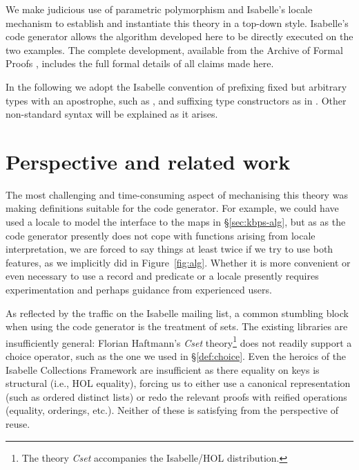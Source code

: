 \documentclass{llncs}
\newcommand{\isafun}[1]{{\sf #1}}
\renewcommand{\isacharprime}{\ensuremath{\mathit{\mskip2mu'\mskip-2mu}}}
\begin{document}
We make judicious use of parametric polymorphism and Isabelle's locale
mechanism \cite{DBLP:conf/mkm/Ballarin06} to establish and instantiate
this theory in a top-down style. Isabelle's code generator
\cite{Haftmann-Nipkow:2010:code} allows the algorithm developed here
to be directly executed on the two examples. The complete development,
available from the Archive of Formal Proofs \cite{Gammie:2011},
includes the full formal details of all claims made here.

In the following we adopt the Isabelle convention of prefixing fixed
but arbitrary types with an apostrophe, such as
\isa{{\isaliteral{27}{\isacharprime}}a}, and suffixing type
constructors as in \isa{{\isaliteral{27}{\isacharprime}}a\
  \isafun{list}}. Other non-standard syntax will be explained as it
arises.



\section{Perspective and related work}
\label{sec:perspective}

The most challenging and time-consuming aspect of mechanising this
theory was making definitions suitable for the code generator. For
example, we could have used a locale to model the interface to the
maps in \S\ref{sec:kbps-alg}, but as as the code generator presently
does not cope with functions arising from locale interpretation, we
are forced to say things at least twice if we try to use both
features, as we implicitly did in Figure~\ref{fig:alg}. Whether it is
more convenient or even necessary to use a record and predicate or a
locale presently requires experimentation and perhaps guidance from
experienced users.

As reflected by the traffic on the Isabelle mailing list, a common
stumbling block when using the code generator is the treatment of
sets. The existing libraries are insufficiently general: Florian
Haftmann's \emph{Cset} theory\footnote{The theory \emph{Cset}
  accompanies the Isabelle/HOL distribution.} does not readily support
a choice operator, such as the one we used in \S\ref{def:choice}. Even
the heroics of the Isabelle Collections Framework
\cite{DBLP:conf/itp/LammichL10} are insufficient as there equality on
keys is structural (i.e., HOL equality), forcing us to either use a
canonical representation (such as ordered distinct lists) or redo the
relevant proofs with reified operations (equality, orderings,
etc.). Neither of these is satisfying from the perspective of reuse.
\end{document}
